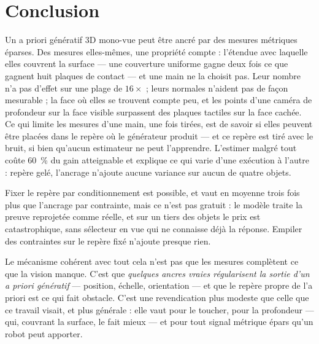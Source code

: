 \documentclass[conference]{IEEEtran}
\begin{document}
\section{Conclusion}

Un a priori génératif 3D mono-vue peut être ancré par des mesures métriques éparses.
Des mesures elles-mêmes, une propriété compte : l'étendue avec laquelle elles couvrent
la surface --- une couverture uniforme gagne deux fois ce que gagnent huit plaques de
contact --- et une main ne la choisit pas. Leur nombre n'a pas d'effet sur une plage de
$16\times$ ; leurs normales n'aident pas de façon mesurable ; la face où elles se
trouvent compte peu, et les points d'une caméra de profondeur sur la face visible
surpassent des plaques tactiles sur la face cachée. Ce qui limite les mesures d'une
main, une fois tirées, est de savoir si elles peuvent être placées dans le repère où
le générateur produit --- et ce repère est tiré avec le bruit, si bien qu'aucun
estimateur ne peut l'apprendre. L'estimer malgré tout coûte 60~\% du gain atteignable et explique ce qui varie d'une exécution à l'autre : repère gelé, l'ancrage n'ajoute aucune variance sur aucun de quatre objets.

Fixer le repère par conditionnement est possible, et vaut en moyenne trois fois plus
que l'ancrage par contrainte, mais ce n'est pas gratuit : le modèle traite la preuve
reprojetée comme réelle, et sur un tiers des objets le prix est catastrophique, sans
sélecteur en vue qui ne connaisse déjà la réponse. Empiler des contraintes sur le
repère fixé n'ajoute presque rien.

Le mécanisme cohérent avec tout cela n'est pas que les mesures complètent ce que la
vision manque. C'est que \emph{quelques ancres vraies régularisent la sortie d'un a
priori génératif} --- position, échelle, orientation --- et que le repère propre de
l'a priori est ce qui fait obstacle. C'est une revendication plus modeste que celle
que ce travail visait, et plus générale : elle vaut pour le toucher, pour la
profondeur --- qui, couvrant la surface, le fait mieux --- et pour tout signal métrique
épars qu'un robot peut apporter.
\end{document}
